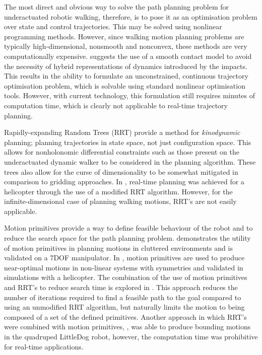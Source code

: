 The most direct and obvious way to solve the path planning problem for underactuated robotic walking, therefore, is to pose it as an optimisation problem over state and control trajectories. This may be solved using nonlinear programming methods. However, since walking motion planning problems are typically high-dimensional, nonsmooth and nonconvex, these methods are very computationally expensive. \cite{tassa2012synthesis} suggests the use of a smooth contact model to avoid the necessity of hybrid representations of dynamics introduced by the impacts. This results in the ability to formulate an unconstrained, continuous trajectory optimisation problem, which is solvable using standard nonlinear optimisation tools. However, with current technology, this formulation still requires minutes of computation time, which is clearly not applicable to real-time trajectory planning. 

Rapidly-expanding Random Trees (RRT) \cite{lavalle2001randomized} provide a method for \textit{kinodynamic} planning; planning trajectories in state space, not just configuration space. This allows for nonholonomic differential constraints such as those present on the underactuated dynamic walker to be considered in the planning algorithm. These trees also allow for the curse of dimensionality to be somewhat mitigated in comparison to gridding approaches. In \cite{frazzoli2002real}, real-time planning was achieved for a helicopter through the use of a modified RRT algorithm. However, for the infinite-dimensional case of planning walking motions, RRT's are not easily applicable. %

Motion primitives provide a way to define feasible behaviour of the robot and to reduce the search space for the path planning problem. \cite{cohen2011planning} demonstrates the utility of motion primitives in planning motions in cluttered environments and is validated on a 7DOF manipulator. In \cite{frazzoli2005maneuver}, motion primitives are used to produce near-optimal motions in non-linear systems with symmetries and validated in simulations with a helicopter. The combination of the use of motion primitives and RRT's to reduce search time is explored in \cite{vonasek2013global}. This approach reduces the number of iterations required to find a feasible path to the goal compared to using an unmodified RRT algorithm, but naturally limits the motion to being composed of a set of the defined primitives. Another approach in which RRT's were combined with motion primitives, \cite{shkolnik2011bounding}, was able to produce bounding motions in the quadruped LittleDog robot, however, the computation time was prohibitive for real-time applications. 

